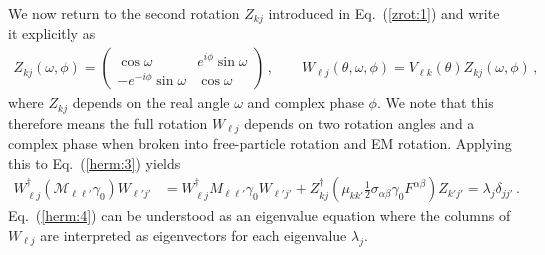 \documentclass[addchapnum]{ws-rv961x669} %
\newcommand{\req}[1]{Eq.~(\ref{#1})}
\begin{document}
We now return to the second rotation $Z_{kj}$ introduced in \req{zrot:1} and write it explicitly as 
\begin{align}
    \label{zrot:2}
    Z_{kj}(\omega,\phi)=
    \begin{pmatrix}
        \cos\omega & e^{i\phi}\sin\omega\\
        -e^{-i\phi}\sin\omega & \cos\omega
    \end{pmatrix}\,,\qquad
    W_{\ell j}(\theta,\omega,\phi)=V_{\ell k}(\theta)Z_{kj}(\omega,\phi)\,,
\end{align}
where $Z_{kj}$ depends on the real angle $\omega$ and complex phase $\phi$. We note that this therefore means the full rotation $W_{\ell j}$ depends on two rotation angles and a complex phase when broken into free-particle rotation and EM rotation. Applying this
to \req{herm:3} yields
\begin{align}
    \label{herm:4}
    W_{\ell j}^{\dag}(\mathcal{M}_{\ell\ell'}\gamma_{0})W_{\ell' j'} &= 
    W_{\ell j}^{\dag}M_{\ell\ell'}\gamma_{0}W_{\ell' j'} +
    Z_{kj}^{\dag}(\mu_{kk'}\frac{1}{2}\sigma_{\alpha\beta}\gamma_{0}F^{\alpha\beta})Z_{k'j'}=\lambda_{j}\delta_{jj'}\,.
\end{align}
\req{herm:4} can be understood as an eigenvalue equation where the columns of $W_{\ell j}$ are interpreted as eigenvectors for each eigenvalue $\lambda_{j}$.
\end{document}
